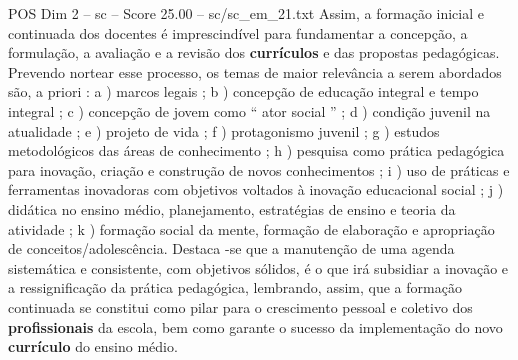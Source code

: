 \begin{textsample}{POS Dim 2 – sc – Score 25.00 – sc/sc\_em\_21.txt}
Assim, a formação inicial e continuada dos docentes é imprescindível para fundamentar a concepção, a formulação, a avaliação e a revisão dos \textbf{currículos} e das propostas pedagógicas.
Prevendo nortear esse processo, os temas de maior relevância a serem abordados são, a priori : a ) marcos legais ; b ) concepção de educação integral e tempo integral ; c ) concepção de jovem como “ ator social ” ; d ) condição juvenil na atualidade ; e ) projeto de vida ; f ) protagonismo juvenil ; g ) estudos metodológicos das áreas de conhecimento ; h ) pesquisa como prática pedagógica para inovação, criação e construção de novos conhecimentos ; i ) uso de práticas e ferramentas inovadoras com objetivos voltados à inovação educacional social ; j ) didática no ensino médio, planejamento, estratégias de ensino e teoria da atividade ; k ) formação social da mente, formação de elaboração e apropriação de conceitos/adolescência.
Destaca -se que a manutenção de uma agenda sistemática e consistente, com objetivos sólidos, é o que irá subsidiar a inovação e a ressignificação da prática pedagógica, lembrando, assim, que a formação continuada se constitui como pilar para o crescimento pessoal e coletivo dos \textbf{profissionais} da escola, bem como garante o sucesso da implementação do novo \textbf{currículo} do ensino médio.

\end{textsample}
